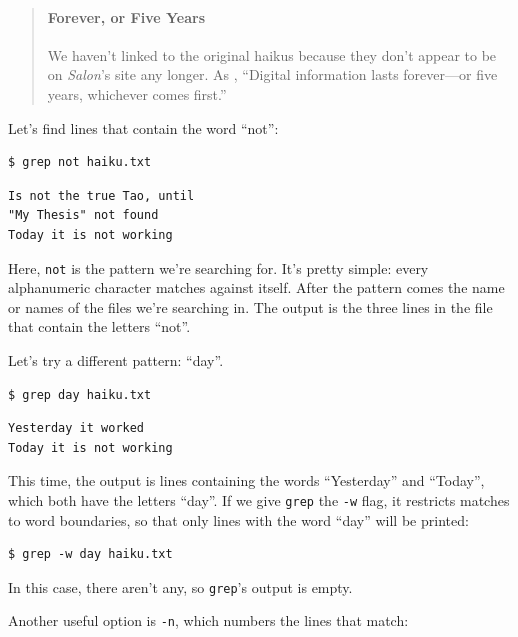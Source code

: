 \documentclass{book}
\begin{document}
\begin{quote}
\mbox{}\paragraph{Forever, or Five Years}

We haven't linked to the original haikus because they don't appear to be
on \emph{Salon}'s site any longer. As
, ``Digital information lasts forever---or five years, whichever
comes first.''
\end{quote}

Let's find lines that contain the word ``not'':

\begin{verbatim}
$ grep not haiku.txt
\end{verbatim}

\begin{verbatim}
Is not the true Tao, until
"My Thesis" not found
Today it is not working
\end{verbatim}

Here, \texttt{not} is the pattern we're searching for. It's pretty
simple: every alphanumeric character matches against itself. After the
pattern comes the name or names of the files we're searching in. The
output is the three lines in the file that contain the letters ``not''.

Let's try a different pattern: ``day''.

\begin{verbatim}
$ grep day haiku.txt
\end{verbatim}

\begin{verbatim}
Yesterday it worked
Today it is not working
\end{verbatim}

This time, the output is lines containing the words ``Yesterday'' and
``Today'', which both have the letters ``day''. If we give \texttt{grep}
the \texttt{-w} flag, it restricts matches to word boundaries, so that
only lines with the word ``day'' will be printed:

\begin{verbatim}
$ grep -w day haiku.txt
\end{verbatim}

In this case, there aren't any, so \texttt{grep}'s output is empty.

Another useful option is \texttt{-n}, which numbers the lines that
match:
\end{document}

